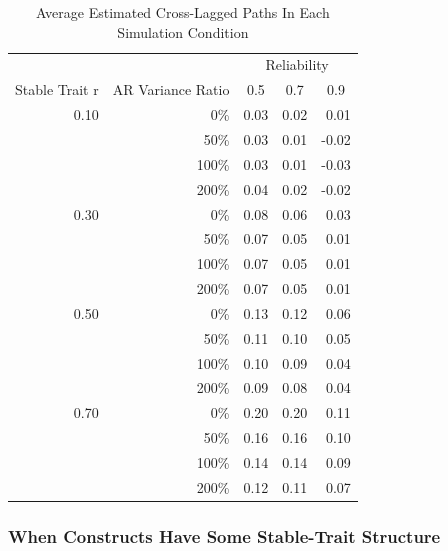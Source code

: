 \documentclass[
  english,
  man,floatsintext]{apa6}
\begin{document}
\begin{table}[tbp]

\begin{center}
\begin{threeparttable}

\caption{\label{tab:simTab}Average Estimated Cross-Lagged Paths In Each Simulation Condition}

\begin{tabular}{rrrrr}
\toprule
 &  & \multicolumn{3}{c}{Reliability} \\
\cmidrule(r){3-5}
Stable Trait r & \multicolumn{1}{c}{AR Variance Ratio} & \multicolumn{1}{c}{0.5} & \multicolumn{1}{c}{0.7} & \multicolumn{1}{c}{0.9}\\
\midrule
0.10 & 0\% & 0.03 & 0.02 & 0.01\\
 & 50\% & 0.03 & 0.01 & -0.02\\
 & 100\% & 0.03 & 0.01 & -0.03\\
 & 200\% & 0.04 & 0.02 & -0.02\\ \midrule
0.30 & 0\% & 0.08 & 0.06 & 0.03\\
 & 50\% & 0.07 & 0.05 & 0.01\\
 & 100\% & 0.07 & 0.05 & 0.01\\
 & 200\% & 0.07 & 0.05 & 0.01\\ \midrule
0.50 & 0\% & 0.13 & 0.12 & 0.06\\
 & 50\% & 0.11 & 0.10 & 0.05\\
 & 100\% & 0.10 & 0.09 & 0.04\\
 & 200\% & 0.09 & 0.08 & 0.04\\ \midrule
0.70 & 0\% & 0.20 & 0.20 & 0.11\\
 & 50\% & 0.16 & 0.16 & 0.10\\
 & 100\% & 0.14 & 0.14 & 0.09\\
 & 200\% & 0.12 & 0.11 & 0.07\\
\bottomrule
\end{tabular}

\end{threeparttable}
\end{center}

\end{table}

\hypertarget{when-constructs-have-some-stable-trait-structure}{%
\subsubsection{When Constructs Have Some Stable-Trait Structure}\label{when-constructs-have-some-stable-trait-structure}}
\end{document}

